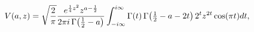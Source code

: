 \[\mathop{V\/}\nolimits\!\left(a,z\right)=\sqrt{\frac{2}{\pi}}\frac{e^{\frac{1}{%
4}z^{2}}z^{a-\frac{1}{2}}}{2\pi i\mathop{\Gamma\/}\nolimits\!\left(\frac{1}{2}%
-a\right)}\*\int_{-i\infty}^{i\infty}\mathop{\Gamma\/}\nolimits\!\left(t\right%
)\mathop{\Gamma\/}\nolimits\!\left(\tfrac{1}{2}-a-2t\right)2^{t}z^{2t}\mathop{%
\cos\/}\nolimits(\pi t)dt,\]